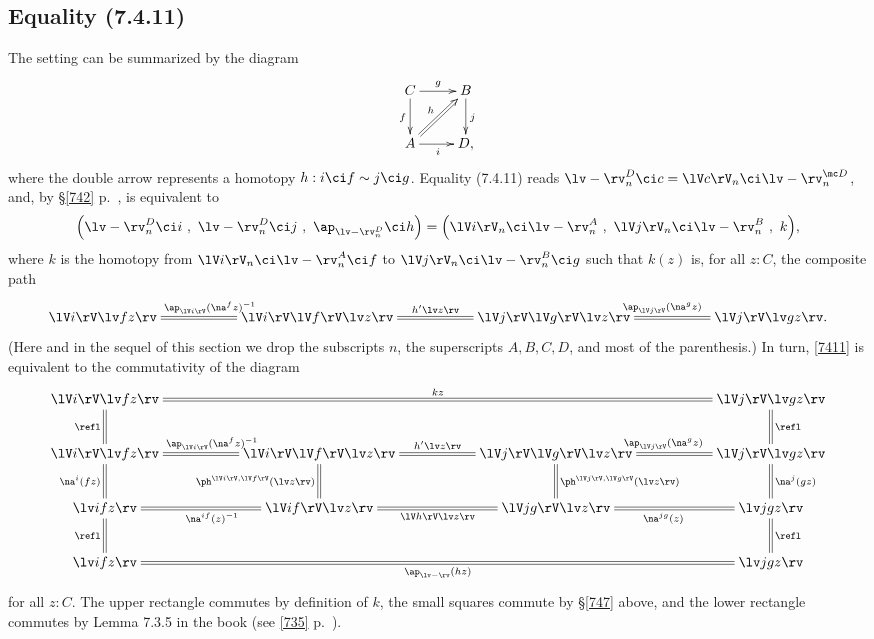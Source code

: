 \documentclass[12pt]{article}
\begin{document}

\subsection{Equality (7.4.11)}

The setting can be summarized by the diagram 
$$
\xymatrix{C\ar[r]^g\ar[d]_f&B\ar[d]^j\\ A\ar[r]_i\ar@{=>}[ur]^h&D,}
$$ 
where the double arrow represents a homotopy $h:i\ci f\sim j\ci g$. Equality (7.4.11) reads $\lv-\rv^D_n\ci c=\lV c\rV_n\ci\lv-\rv^{\mc D}_n$, and, by \S\ref{742} p.~\pageref{742}, is equivalent to
\begin{equation}\label{7411}
\Big(\lv-\rv^D_n\ci i\ ,\ \lv-\rv^D_n\ci j\ ,\ \ap_{\lv-\rv^D_n}\ci h\Big)
=
\Big(\lV i\rV_n\ci\lv-\rv^A_n\ ,\ \lV j\rV_n\ci\lv-\rv^B_n\ ,\ k\Big),
\end{equation}
where $k$ is the homotopy from $\lV i\rV_n\ci\lv-\rv^A_n\ci f$ to $\lV j\rV_n\ci\lv-\rv^B_n\ci g$ such that $k(z)$ is, for all $z:C$, the composite path
$$
\xymatrix{
\lV i\rV\lv fz\rv&&
\lV i\rV\lV f\rV\lv z\rv\ar@{=}[ll]_{\ap_{\lV i\rV}(\na^fz)^{-1}}\ar@{=}[rr]^{h'\lv z\rv}&&
\lV j\rV\lV g\rV\lv z\rv\ar@{=}[rr]^{\ap_{\lV j\rV}(\na^gz)}&&
\lV j\rV\lv gz\rv.}
$$ 
(Here and in the sequel of this section we drop the subscripts $n$, the superscripts $A,B,C,D$, and most of the parenthesis.) In turn, \eqref{7411} is equivalent to the commutativity of the diagram %
$$ 
\xymatrix{
\lV i\rV\lv fz\rv\ar@{=}[d]_{\refl}\ar@{=}[rrrrrr]^{kz}&&&&&&\lV j\rV\lv gz\rv\ar@{=}[d]^{\refl}\\
\lV i\rV\lv fz\rv\ar@{=}[d]_{\na^i(fz)}&&
\lV i\rV\lV f\rV\lv z\rv\ar@{=}[ll]_{\ap_{\lV i\rV}(\na^fz)^{-1}}\ar@{=}[d]_{\ph^{\lV i\rV,\lV f\rV}(\lv z\rv)}\ar@{=}[rr]^{h'\lv z\rv}&&
\lV j\rV\lV g\rV\lv z\rv\ar@{=}[d]^{\ph^{\lV j\rV,\lV g\rV}(\lv z\rv)}\ar@{=}[rr]^{\ap_{\lV j\rV}(\na^gz)}&&
\lV j\rV\lv gz\rv\ar@{=}[d]^{\na^j(gz)}\\
%
\lv ifz\rv&&\lV if\rV\lv z\rv\ar@{=}[rr]_{\lV h\rV\lv z\rv}\ar@{=}[ll]^{\na^{if}(z)^{-1}}&&\lV jg\rV\lv z\rv\ar@{=}[rr]_{\na^{jg}(z)}&&\lv jgz\rv\\ 
\lv ifz\rv\ar@{=}[u]^{\refl}\ar@{=}[rrrrrr]_{\ap_{\lv-\rv}(hz)}&&&&&&\lv jgz\rv\ar@{=}[u]_{\refl}}
$$ 
for all $z:C$. The upper rectangle commutes by definition of $k$, the small squares commute by \S\ref{747} above, and the lower rectangle commutes by Lemma 7.3.5 in the book (see \eqref{735} p.~\pageref{735}).
\end{document}
